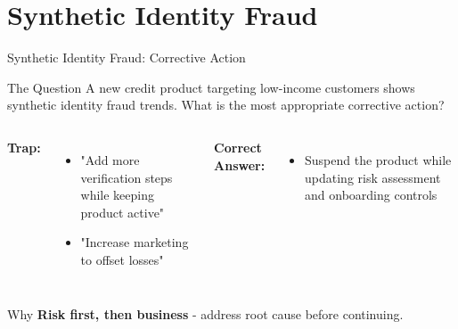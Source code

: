 \documentclass{beamer}
\begin{document}
\section{Synthetic Identity Fraud}
\begin{frame}{Synthetic Identity Fraud: Corrective Action}
\begin{block}{The Question}
\small{A new credit product targeting low-income customers shows synthetic identity fraud trends. What is the most appropriate corrective action?}
\end{block}

\vspace{0.3cm}
\begin{columns}
\textcolor{wrong}{\textbf{ Trap:}}
\begin{itemize}
    \item "Add more verification steps while keeping product active"
    \item "Increase marketing to offset losses"
\end{itemize}

\textcolor{correct}{\textbf{Correct Answer:}}
\begin{itemize}
    \item Suspend the product while updating risk assessment and onboarding controls
\end{itemize}
\end{columns}

\begin{block}{Why}
\textbf{Risk first, then business} - address root cause before continuing.
\end{block}
\end{frame}

\end{document}
